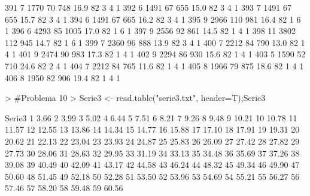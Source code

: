 \documentclass{article}
\begin{document}
\begin{Schunk}
\begin{Soutput}
391       7  1770  70  748 16.9  82      3       4        1
392       6  1491  67  655 15.0  82      3       4        1
393       7  1491  67  655 15.7  82      3       4        1
394       6  1491  67  665 16.2  82      3       4        1
395       9  2966 110  981 16.4  82      1       6        1
396       6  4293  85 1005 17.0  82      1       6        1
397       9  2556  92  861 14.5  82      1       4        1
398      11  3802 112  945 14.7  82      1       6        1
399       7  2360  96  888 13.9  82      3       4        1
400       7  2212  84  790 13.0  82      1       4        1
401       9  2474  90  983 17.3  82      1       4        1
402       9  2294  86  930 15.6  82      1       4        1
403       5  1590  52  710 24.6  82      2       4        1
404       7  2212  84  765 11.6  82      1       4        1
405       8  1966  79  875 18.6  82      1       4        1
406       8  1950  82  906 19.4  82      1       4        1
\end{Soutput}
\end{Schunk}

\begin{Schunk}
\begin{Sinput}
> #Problema 10
> Serie3 <- read.table("serie3.txt", header=T);Serie3
\end{Sinput}
\begin{Soutput}
   Serie3
1    3.66
2    3.99
3    5.02
4    6.44
5    7.51
6    8.21
7    9.26
8    9.48
9   10.21
10  10.78
11  11.57
12  12.55
13  13.86
14  14.34
15  14.77
16  15.88
17  17.10
18  17.91
19  19.31
20  20.62
21  22.13
22  23.04
23  23.93
24  24.87
25  25.83
26  26.09
27  27.42
28  27.82
29  27.73
30  28.06
31  28.63
32  29.95
33  31.19
34  33.13
35  34.48
36  35.69
37  37.26
38  39.08
39  40.49
40  42.09
41  43.17
42  44.58
43  46.24
44  48.32
45  49.34
46  49.90
47  50.60
48  51.45
49  52.18
50  52.28
51  53.50
52  53.96
53  54.69
54  55.21
55  56.27
56  57.46
57  58.20
58  59.48
59  60.56
\end{Soutput}
\end{Schunk}
\end{document}
